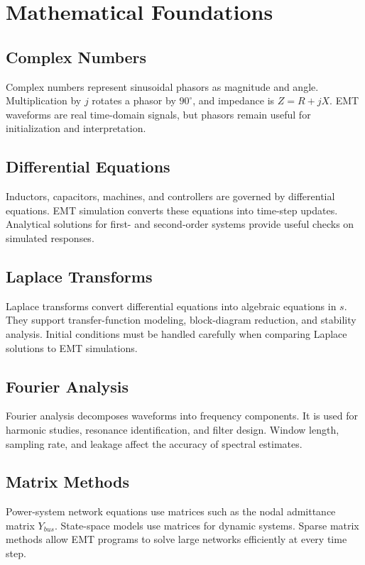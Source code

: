 \documentclass[11pt]{article}
\begin{document}
\section{Mathematical Foundations}
\subsection{Complex Numbers}
Complex numbers represent sinusoidal phasors as magnitude and angle. Multiplication by $j$ rotates a phasor by $90^\circ$, and impedance is $Z=R+jX$. EMT waveforms are real time-domain signals, but phasors remain useful for initialization and interpretation.

\subsection{Differential Equations}
Inductors, capacitors, machines, and controllers are governed by differential equations. EMT simulation converts these equations into time-step updates. Analytical solutions for first- and second-order systems provide useful checks on simulated responses.

\subsection{Laplace Transforms}
Laplace transforms convert differential equations into algebraic equations in $s$. They support transfer-function modeling, block-diagram reduction, and stability analysis. Initial conditions must be handled carefully when comparing Laplace solutions to EMT simulations.

\subsection{Fourier Analysis}
Fourier analysis decomposes waveforms into frequency components. It is used for harmonic studies, resonance identification, and filter design. Window length, sampling rate, and leakage affect the accuracy of spectral estimates.

\subsection{Matrix Methods}
Power-system network equations use matrices such as the nodal admittance matrix $Y_{bus}$. State-space models use matrices for dynamic systems. Sparse matrix methods allow EMT programs to solve large networks efficiently at every time step.
\end{document}
